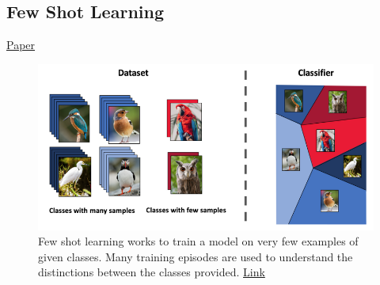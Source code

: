 \documentclass{article}
\begin{document}
\newpage
\subsection{Few Shot Learning}
\href{https://openreview.net/forum?id=HkxLXnAcFQ}{Paper}
\begin{figure}[H]
    \centering
    \includegraphics[width=4.5in]{fewshot.png}
    \caption{Few shot learning works to train a model on very few examples of given classes. Many training episodes are used to understand the distinctions between the classes provided.  \href{https://medium.com/sap-machine-learning-research/deep-few-shot-learning-a1caa289f18}{Link}}
\end{figure}
\newpage
\end{document}
